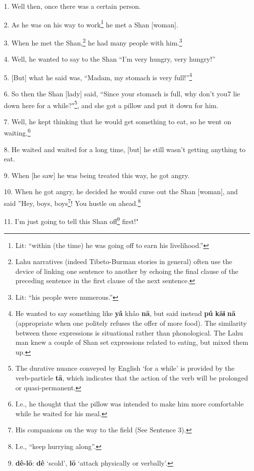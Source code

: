 \setcounter{footnote}{0}

1. Well then, once there was a certain person.

2. As he was on his way to work\footnote{Lit: ``within (the time) he was going off to earn his livelihood.''} he met a Shan [woman].

3. When he met the Shan,\footnote{Lahu narratives (indeed Tibeto-Burman stories in general) often use the device of linking one sentence to another by echoing the final clause of the preceding sentence in the first clause of the next sentence.} he had many people with him.\footnote{Lit: ``his people were numerous.''}

4. Well, he wanted to say to the Shan ``I'm very hungry, very hungry!''

5. [But] what he said was, ``Madam, my stomach is very full!''\footnote{He wanted to say something like \textbf{yâ} khâo \textbf{nā}, but said instead \textbf{pú} \textbf{kāɨ} \textbf{nā} (appropriate when one politely refuses the offer of more food). The similarity between these expressions is situational rather than phonological. The Lahu man knew a couple of Shan set expressions related to eating, but mixed them up.}

6. So then the Shan [lady] said, ``Since your stomach is full, why don't
you7 lie down here for a while?"\footnote{The durative nuance conveyed by English `for a while' is provided by the verb-particle \textbf{tā}, which indicates that the action of the verb will be prolonged or quasi-permanent.}, and she got a pillow and put it
down for him.

7. Well, he kept thinking that he would get something to eat, so he went on waiting.\footnote{I.e., he thought that the pillow was intended to make him more comfortable while he waited for his meal.}

8. He waited and waited for a long time, [but] he still wasn't getting anything
to eat.

9. When [he saw] he was being treated this way, he got angry.

10. When he got angry, he decided he would curse out the Shan [woman], and said
''Hey, boys, boys\footnote{His companions on the way to the field (See Sentence 3).}! You hustle on ahead.\footnote{I.e., ``keep hurrying along''.}

11. I'm just going to tell this Shan off\footnote{\textbf{dê-lō}: \textbf{dê} `scold', \textbf{lō} `attack physically or verbally'.} first!"

